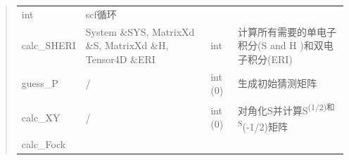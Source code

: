 \documentclass[11pt]{article}
\begin{document}
\begin{quote}
\begin{longtable}[]{@{}llll@{}}
\begin{minipage}[t]{0.09\columnwidth}
int\strut
\end{minipage} & \begin{minipage}[t]{0.51\columnwidth}\raggedright\strut
scf循环\strut
\end{minipage}\tabularnewline
\begin{minipage}[t]{0.15\columnwidth}\raggedright\strut
calc\_SHERI\strut
\end{minipage} & \begin{minipage}[t]{0.14\columnwidth}\raggedright\strut
System \&SYS, MatrixXd \&S, MatrixXd \&H, Tensor4D \&ERI\strut
\end{minipage} & \begin{minipage}[t]{0.09\columnwidth}\raggedright\strut
int\strut
\end{minipage} & \begin{minipage}[t]{0.51\columnwidth}\raggedright\strut
计算所有需要的单电子积分(S and H )和双电子积分(ERI)\strut
\end{minipage}\tabularnewline
\begin{minipage}[t]{0.15\columnwidth}\raggedright\strut
guess\_P\strut
\end{minipage} & \begin{minipage}[t]{0.14\columnwidth}\raggedright\strut
/\strut
\end{minipage} & \begin{minipage}[t]{0.09\columnwidth}\raggedright\strut
int (0)\strut
\end{minipage} & \begin{minipage}[t]{0.51\columnwidth}\raggedright\strut
生成初始猜测矩阵\strut
\end{minipage}\tabularnewline
\begin{minipage}[t]{0.15\columnwidth}\raggedright\strut
calc\_XY\strut
\end{minipage} & \begin{minipage}[t]{0.14\columnwidth}\raggedright\strut
/\strut
\end{minipage} & \begin{minipage}[t]{0.09\columnwidth}\raggedright\strut
int (0)\strut
\end{minipage} & \begin{minipage}[t]{0.51\columnwidth}\raggedright\strut
对角化S并计算S\textsuperscript{(1/2)和S}(-1/2)矩阵\strut
\end{minipage}\tabularnewline
\begin{minipage}[t]{0.15\columnwidth}\raggedright\strut
calc\_Fock\strut
\end{minipage} & \begin{minipage}[t]{0.14\columnwidth}\raggedright\strut

\end{minipage}
\end{longtable}
\end{quote}
\end{document}
